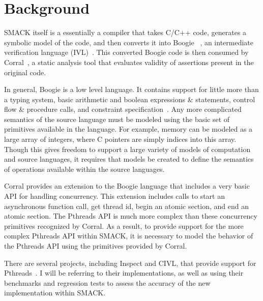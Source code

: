 \chapter{Background}\label{thesis_background}
SMACK itself is a essentially a compiler that takes C/C++ code, generates a symbolic model of the code, and then converts it into Boogie ~\cite{boogie}, an intermediate verification language (IVL)~\cite{smack}.  This converted Boogie code is then consumed by Corral~\cite{corral}, a static analysis tool that evaluates validity of assertions present in the original code.

In general, Boogie is a low level language.  It contains support for little more than a typing system, basic arithmetic and boolean expressions \& statements, control flow \& procedure calls, and constraint specification~\cite{boogie}.  Any more complicated semantics of the source language must be modeled using the basic set of primitives available in the language.  For example, memory can be modeled as a large array of integers, where C pointers are simply indices into this array.  Though this gives freedom to support a large variety of models of computation and source languages, it requires that models be created to define the semantics of operations available within the source languages.

Corral provides an extension to the Boogie language that includes a very basic API for handling concurrency.  This extension includes calls to start an asynchronous function call, get thread id, begin an atomic section, and end an atomic section.  The Pthreads API is much more complex than these concurrency primitives recognized by Corral.  As a result, to provide support for the more complex Pthreads API within SMACK, it is necessary to model the behavior of the Pthreads API using the primitives provided by Corral.

There are several projects, including Inspect and CIVL, that provide support for Pthreads~\cite{civl}\cite{inspect}.  I will be referring to their implementations, as well as using their benchmarks and regression tests to assess the accuracy of the new implementation within SMACK.
